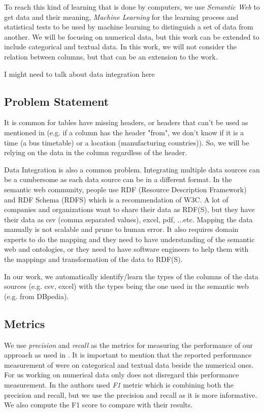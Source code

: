 \documentclass{article}
\newcommand{\comm}[2][inline]{\color{green} #2 \color{black}}
\begin{document}
To reach this kind of learning that is done by computers, we use \textit{Semantic Web} to get data and their meaning, \textit{Machine Learning} for the learning process and statistical tests to be used by machine learning to distinguish a set of data from another. We will be focusing on numerical data, but this work can be extended to include categorical and textual data. In this work, we will not consider the relation between columns, but that can be an extension to the work. 

\comm{I might need to talk about data integration here}

\subsection{Problem Statement}
It is common for tables have missing headers, or headers that can\rq t be used as mentioned in \cite{webtables-power-2008} (e.g. if a column has the header "from", we don\rq t know if it is a time (a bus timetable) or a location (manufacturing countries)). So, we will be relying on the data in the column regardless of the header. 

Data Integration is also a common problem. Integrating multiple data sources can be a cumbersome as each data source can be in a different format. In the semantic web community, people use RDF (Resource Description Framework) and RDF Schema (RDFS) which is a recommendation of W3C. A lot of companies and organizations want to share their data as RDF(S), but they have their data as csv (comma separated values), excel, pdf, ...etc. Mapping the data manually is not scalable and prune to human error. It also requires domain experts to do the mapping and they need to have understanding of the semantic web and ontologies, or they need to have software engineers to help them with the mappings and transformation of the data to RDF(S).

In our work, we automatically identify/learn the types of the columns of the data sources (e.g. csv, excel) with the types being the one used in the semantic web (e.g. from DBpedia\cite{dbpedia-site}).


\subsection{Metrics}
We use \textit{precision} and \textit{recall} as the metrics for measuring the performance of our approach as used in \cite{karma}. It is important to mention that the reported performance measurement of \cite{karma} were on categorical and textual data beside the numerical ones. For us working on numerical data only does not disregard this performance measurement. In \cite{ann-ser-webtables} the authors used \textit{F1} metric which is combining both the precision and recall, but we use the precision and recall as it is more informative. We also compute the F1 score to compare with their results.
\end{document}
